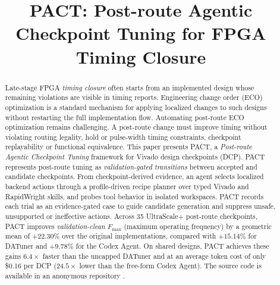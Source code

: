\documentclass[conference]{IEEEtran}
\begin{document}
\title{PACT: Post-route Agentic Checkpoint Tuning for
FPGA Timing Closure}

\author{}

\maketitle

\begin{abstract}
Late-stage FPGA \emph{timing closure} often starts from an implemented
design whose remaining violations are visible in timing reports.
Engineering change order (ECO) optimization is a standard mechanism for applying localized changes to such designs without restarting the full implementation flow.
Automating post-route ECO optimization remains challenging.
A post-route
change must improve timing without violating routing legality, hold or
pulse-width timing constraints, checkpoint replayability
or functional equivalence.
 This paper presents PACT, a
\emph{Post-route Agentic Checkpoint Tuning} framework
for Vivado design checkpoints (DCP). 
PACT represents post-route tuning as
\emph{validation-gated transitions} between accepted
and candidate checkpoints. From checkpoint-derived evidence, an agent
selects
localized backend actions through a profile-driven recipe planner over
typed Vivado and RapidWright
skills, and probes tool behavior in isolated workspaces. 
PACT records each trial as an evidence-gated case to guide candidate generation and suppress unsafe, unsupported or ineffective actions.
Across 35 UltraScale+ post-route checkpoints, PACT
improves \emph{validation-clean} $F_{\max}$ (maximum operating
frequency) by a geometric mean of
$+22.30\%$ over the original implementations, compared with
$+15.14\%$ for DATuner and $+9.78\%$ for the Codex Agent. On
shared designs, PACT achieves these gains $6.4\times$ faster than the
uncapped DATuner and at an average token cost of only \$0.16 per DCP ($24.5\times$ lower than the free-form Codex Agent). 
The source code is available in an anonymous repository \cite{code}.



\end{abstract}




\end{document}
